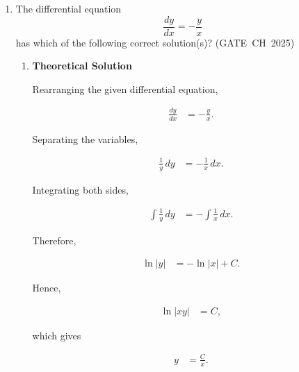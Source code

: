 \begin{enumerate}[label=\thesubsection.\arabic*, ref=\thesubsection.\theenumi,itemsep=0pt]
\item The differential equation\\
\[
\frac{dy}{dx}=-\frac{y}{x}
\]
has which of the following correct solution(s)? \hfill (GATE~CH~2025)
\begin{enumerate}[itemsep=0pt]
\end{enumerate}
\solution

\begingroup

\renewcommand{\theenumii}{\theenumi.\arabic{enumii}}

\begin{enumerate}[label=\theenumii, ref=\theenumii, itemsep=0pt]

\item \textbf{Theoretical Solution}

Rearranging the given differential equation,

\begin{align}
\frac{dy}{dx}
&=-\frac{y}{x}.
\end{align}

Separating the variables,

\begin{align}
\frac{1}{y}\,dy
&=-\frac{1}{x}\,dx.
\end{align}

Integrating both sides,

\begin{align}
\int\frac{1}{y}\,dy
&=-\int\frac{1}{x}\,dx.
\end{align}

Therefore,

\begin{align}
\ln|y|
&=-\ln|x|+C.
\end{align}

Hence,

\begin{align}
\ln|xy|
&=C,
\end{align}

which gives

\begin{align}
y&=\frac{C}{x}.
\end{align}


\end{enumerate}
\end{enumerate}
